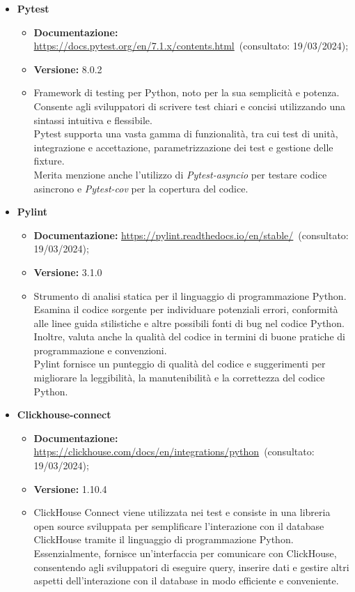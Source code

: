 \begin{itemize}
    \item \textbf{Pytest}
    \begin{itemize}
        \item \textbf{Documentazione:} \url{https://docs.pytest.org/en/7.1.x/contents.html}~(consultato: 19/03/2024);
        \item \textbf{Versione:} 8.0.2
        \item Framework di testing per Python, noto per la sua semplicità e potenza. Consente agli sviluppatori di scrivere test chiari e concisi utilizzando una sintassi intuitiva e flessibile. \\
        Pytest supporta una vasta gamma di funzionalità, tra cui test di unità, integrazione e accettazione, parametrizzazione dei test e gestione delle fixture. \\
        Merita menzione anche l'utilizzo di \textit{Pytest-asyncio} per testare codice asincrono e \textit{Pytest-cov} per la copertura del codice.
    \end{itemize}
    
    \item \textbf{Pylint}
    \begin{itemize}
        \item \textbf{Documentazione:} \url{https://pylint.readthedocs.io/en/stable/}~(consultato: 19/03/2024);
        \item \textbf{Versione:} 3.1.0
        \item Strumento di analisi statica per il linguaggio di programmazione Python. Esamina il codice sorgente per individuare potenziali errori, conformità alle linee guida stilistiche e altre possibili fonti di bug nel codice Python. Inoltre, valuta anche la qualità del codice in termini di buone pratiche di programmazione e convenzioni. \\
        Pylint fornisce un punteggio di qualità del codice e suggerimenti per migliorare la leggibilità, la manutenibilità e la correttezza del codice Python.
    \end{itemize}
    
    \item \textbf{Clickhouse-connect}
    \begin{itemize}
        \item \textbf{Documentazione:} \url{https://clickhouse.com/docs/en/integrations/python}~(consultato: 19/03/2024);
        \item \textbf{Versione:} 1.10.4
        \item ClickHouse Connect viene utilizzata nei test e consiste in una libreria open source sviluppata per semplificare l'interazione con il database ClickHouse tramite il linguaggio di programmazione Python. Essenzialmente, fornisce un'interfaccia per comunicare con ClickHouse, consentendo agli sviluppatori di eseguire query, inserire dati e gestire altri aspetti dell'interazione con il database in modo efficiente e conveniente.
    \end{itemize}
\end{itemize}

